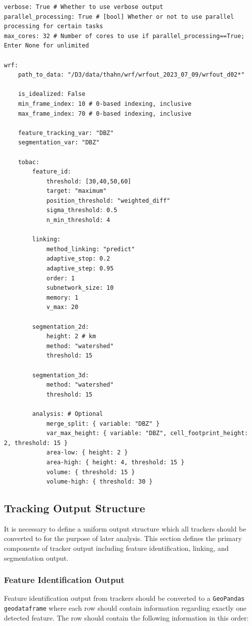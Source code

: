 \documentclass[10pt,a4paper]{article}
\begin{document}
	\begin{Verbatim}[tabsize=3]
verbose: True # Whether to use verbose output
parallel_processing: True # [bool] Whether or not to use parallel processing for certain tasks
max_cores: 32 # Number of cores to use if parallel_processing==True; Enter None for unlimited

wrf:
	path_to_data: "/D3/data/thahn/wrf/wrfout_2023_07_09/wrfout_d02*"

	is_idealized: False
	min_frame_index: 10 # 0-based indexing, inclusive
	max_frame_index: 70 # 0-based indexing, inclusive

	feature_tracking_var: "DBZ"
	segmentation_var: "DBZ"

	tobac:
		feature_id:
			threshold: [30,40,50,60]
			target: "maximum"
			position_threshold: "weighted_diff"
			sigma_threshold: 0.5
			n_min_threshold: 4

		linking: 
			method_linking: "predict"
			adaptive_stop: 0.2
			adaptive_step: 0.95
			order: 1
			subnetwork_size: 10
			memory: 1
			v_max: 20

		segmentation_2d:
			height: 2 # km
			method: "watershed"
			threshold: 15

		segmentation_3d:
			method: "watershed"
			threshold: 15

		analysis: # Optional
			merge_split: { variable: "DBZ" }
			var_max_height: { variable: "DBZ", cell_footprint_height: 2, threshold: 15 }
			area-low: { height: 2 }
			area-high: { height: 4, threshold: 15 }
			volume: { threshold: 15 }
			volume-high: { threshold: 30 }
	\end{Verbatim}
	
	\subsection{Tracking Output Structure}
	It is necessary to define a uniform output structure which all trackers should be converted to for the purpose of later analysis. This section defines the primary components of tracker output including feature identification, linking, and segmentation output.
	
	\subsubsection{Feature Identification Output}
	Feature identification output from trackers should be converted to a \verb|GeoPandas geodataframe| where each row should contain information regarding exactly one detected feature. The row should contain the following information in this order:
	
\end{document}
